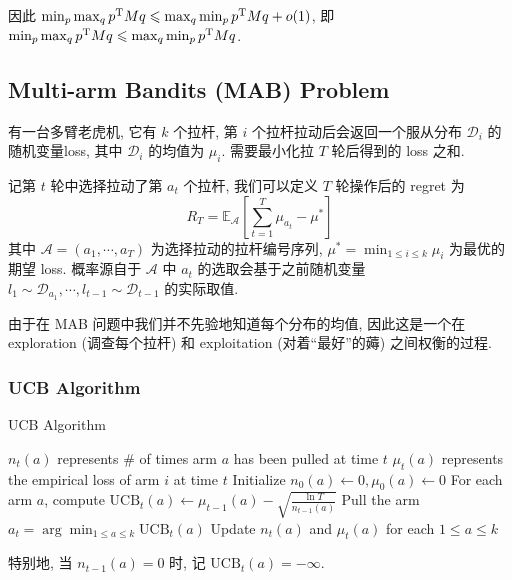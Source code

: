 \documentclass[8pt]{article}
\theoremstyle{compact}
\def\le{\leqslant}
\begin{document}
因此 $\min_p\max_q p^{\text T}Mq \le \max_q\min_p p^{\text T}Mq + o(1)$, 即 $\min_p\max_q p^{\text T}Mq \le \max_q\min_p p^{\text T}Mq$.

\subsection{Multi-arm Bandits (MAB) Problem}
有一台多臂老虎机, 它有 $k$ 个拉杆, 第 $i$ 个拉杆拉动后会返回一个服从分布 $\mathcal D_i$ 的随机变量loss, 其中 $\mathcal D_i$ 的均值为 $\mu_i$. 需要最小化拉 $T$ 轮后得到的 loss 之和.

记第 $t$ 轮中选择拉动了第 $a_t$ 个拉杆, 我们可以定义 $T$ 轮操作后的 regret 为 $$R_T = \mathbb E_{\mathcal A}\left[\sum_{t=1}^T\mu_{a_t} - \mu^*\right]$$ 其中 $\mathcal A = (a_1, \cdots, a_T)$ 为选择拉动的拉杆编号序列, $\mu^* = \min_{1 \le i \le k}\mu_i$ 为最优的期望 loss. 概率源自于 $\mathcal A$ 中 $a_t$ 的选取会基于之前随机变量 $l_1 \sim \mathcal D_{a_1}, \cdots, l_{t-1} \sim \mathcal D_{t-1}$ 的实际取值.

由于在 MAB 问题中我们并不先验地知道每个分布的均值, 因此这是一个在 exploration (调查每个拉杆) 和 exploitation (对着“最好”的薅) 之间权衡的过程.

\subsubsection{UCB Algorithm}

\begin{algorithm}
	\caption{UCB Algorithm}
	\begin{algorithmic}[1]
		\State $n_t(a)$ represents \# of times arm $a$ has been pulled at time $t$
		\State $\mu_t(a)$ represents the empirical loss of arm $i$ at time $t$
		\State Initialize $n_0(a) \gets 0, \mu_0(a) \gets 0$
			\State For each arm $a$, compute $\text{UCB}_t(a) \gets \mu_{t-1}(a) - \sqrt{\frac{\ln T}{n_{t-1}(a)}}$
			\State Pull the arm $a_t = \arg \min_{1 \le a \le k}\text{UCB}_t(a)$
			\State Update $n_t(a)$ and $\mu_t(a)$ for each $1 \le a \le k$
		\EndFor
	\end{algorithmic}
\end{algorithm}

特别地, 当 $n_{t-1}(a) = 0$ 时, 记 $\text{UCB}_t(a) = -\infty$.
\end{document}
